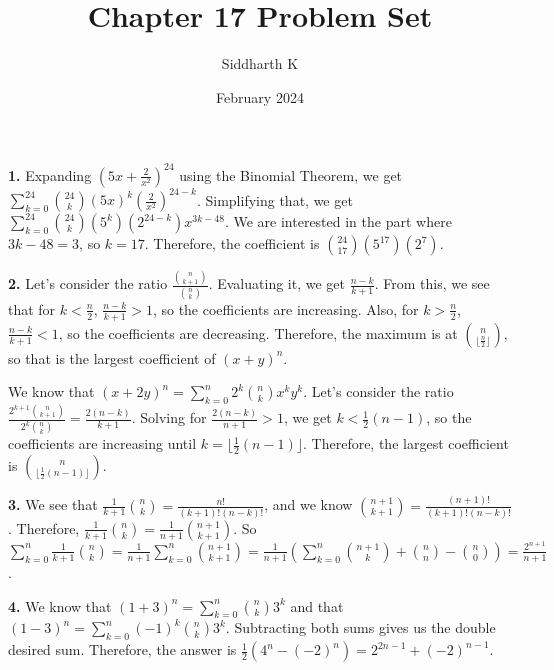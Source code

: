 \documentclass{article}
\title{Chapter 17 Problem Set}
\author{Siddharth K}
\date{February 2024}
\begin{document}
\maketitle

\textbf{1.} Expanding $(5x + \frac{2}{x^2})^{24}$ using the Binomial Theorem, we get $\sum_{k = 0}^{24}{{24}\choose k}(5x)^k\left(\frac{2}{x^2}\right)^{24 - k}$. Simplifying that, we get $\sum_{k = 0}^{24}{{24}\choose k}(5^k)(2^{24 - k})x^{3k - 48}$. We are interested in the part where $3k - 48 = 3$, so $k = 17$. Therefore, the coefficient is ${{24}\choose {17}}(5^{17})(2^7)$.
\newline

\textbf{2.} Let's consider the ratio $\frac{{n\choose {k + 1}}}{{n\choose k}}$. Evaluating it, we get $\frac{n - k}{k + 1}$. From this, we see that for $k < \frac{n}{2}$, $\frac{n - k}{k + 1} > 1$, so the coefficients are increasing. Also, for $k > \frac{n}{2}$, $\frac{n - k}{k + 1} < 1$, so the coefficients are decreasing. Therefore, the maximum is at $n\choose {\lfloor \frac{n}{2} \rfloor}$, so that is the largest coefficient of $(x + y)^n$.
\newline

We know that $(x + 2y)^n = \sum_{k = 0}^n 2^k{n\choose k}x^ky^k$. Let's consider the ratio $\frac{2^{k + 1}{n\choose {k + 1}}}{2^k{n\choose k}} = \frac{2(n - k)}{k + 1}$. Solving for $\frac{2(n - k)}{n + 1} > 1$, we get $k < \frac{1}{2}(n - 1)$, so the coefficients are increasing until $k = \lfloor 
\frac{1}{2}(n - 1) \rfloor$. Therefore, the largest coefficient is $n\choose {\lfloor \frac{1}{2}(n - 1) \rfloor}$.
\newline

\textbf{3.} We see that $\frac{1}{k + 1}{n\choose k} = \frac{n!}{(k + 1)!(n - k)!}$, and we know ${{n + 1}\choose {k + 1}} = \frac{(n + 1)!}{(k + 1)!(n - k)!}$. Therefore, $\frac{1}{k + 1}{n\choose k} = \frac{1}{n + 1}{{n + 1}\choose {k + 1}}$. So $\sum_{k = 0}^n \frac{1}{k + 1}{n\choose k} = \frac{1}{n + 1}\sum_{k = 0}^n{{n + 1}\choose {k + 1}} = \frac{1}{n + 1}(\sum_{k = 0}^n{{n + 1}\choose k} + {n\choose n} - {n\choose 0}) =\frac{2^{n + 1}}{n + 1}$.
\newline

\textbf{4.} We know that $(1 + 3)^n = \sum_{k = 0}^n {n\choose k}3^k$ and that $(1 - 3)^n = \sum_{k = 0}^n (-1)^k{n\choose k}3^k$. Subtracting both sums gives us the double desired sum. Therefore, the answer is $\frac{1}{2}(4^n - (-2)^n) = 2^{2n - 1} + (-2)^{n - 1}$.
\newline
\end{document}
